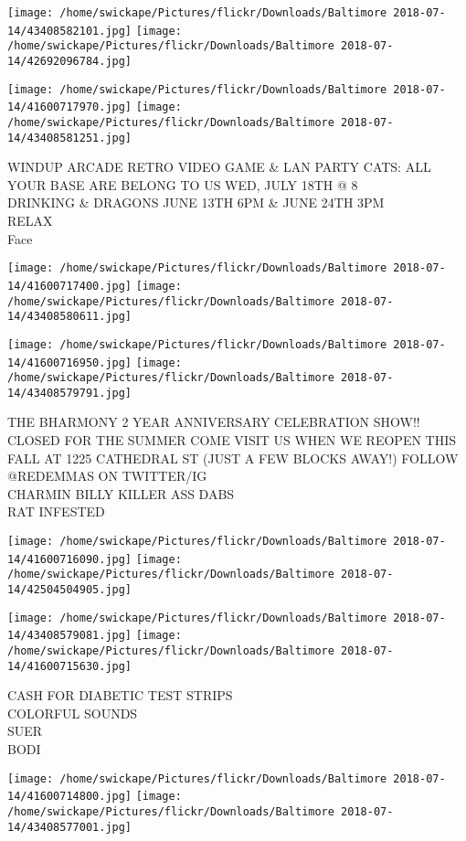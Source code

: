 \documentclass[10pt,letterpaper]{article}
\begin{document}
\texttt{[image: /home/swickape/Pictures/flickr/Downloads/Baltimore 2018-07-14/43408582101.jpg]}
\texttt{[image: /home/swickape/Pictures/flickr/Downloads/Baltimore 2018-07-14/42692096784.jpg]}

\texttt{[image: /home/swickape/Pictures/flickr/Downloads/Baltimore 2018-07-14/41600717970.jpg]}
\texttt{[image: /home/swickape/Pictures/flickr/Downloads/Baltimore 2018-07-14/43408581251.jpg]}

WINDUP ARCADE RETRO VIDEO GAME \& LAN PARTY CATS: ALL YOUR BASE ARE BELONG TO US WED, JULY 18TH @ 8\\
DRINKING \& DRAGONS JUNE 13TH 6PM \& JUNE 24TH 3PM\\
RELAX\\
Face
\pagebreak

\texttt{[image: /home/swickape/Pictures/flickr/Downloads/Baltimore 2018-07-14/41600717400.jpg]}
\texttt{[image: /home/swickape/Pictures/flickr/Downloads/Baltimore 2018-07-14/43408580611.jpg]}

\texttt{[image: /home/swickape/Pictures/flickr/Downloads/Baltimore 2018-07-14/41600716950.jpg]}
\texttt{[image: /home/swickape/Pictures/flickr/Downloads/Baltimore 2018-07-14/43408579791.jpg]}

THE BHARMONY 2 YEAR ANNIVERSARY CELEBRATION SHOW!!\\
CLOSED FOR THE SUMMER COME VISIT US WHEN WE REOPEN THIS FALL AT 1225 CATHEDRAL ST (JUST A FEW BLOCKS AWAY!) FOLLOW @REDEMMAS ON TWITTER/IG\\
CHARMIN BILLY KILLER ASS DABS\\
RAT INFESTED
\pagebreak

\texttt{[image: /home/swickape/Pictures/flickr/Downloads/Baltimore 2018-07-14/41600716090.jpg]}
\texttt{[image: /home/swickape/Pictures/flickr/Downloads/Baltimore 2018-07-14/42504504905.jpg]}

\texttt{[image: /home/swickape/Pictures/flickr/Downloads/Baltimore 2018-07-14/43408579081.jpg]}
\texttt{[image: /home/swickape/Pictures/flickr/Downloads/Baltimore 2018-07-14/41600715630.jpg]}

CASH FOR DIABETIC TEST STRIPS\\
COLORFUL SOUNDS\\
SUER\\
BODI
\pagebreak

\texttt{[image: /home/swickape/Pictures/flickr/Downloads/Baltimore 2018-07-14/41600714800.jpg]}
\texttt{[image: /home/swickape/Pictures/flickr/Downloads/Baltimore 2018-07-14/43408577001.jpg]}
\end{document}

